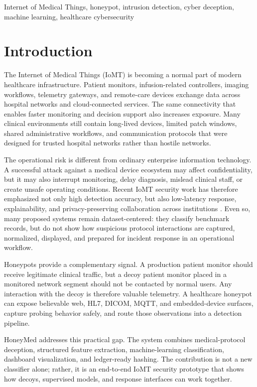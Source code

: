 \documentclass[conference, a4paper]{IEEEtran}
\begin{document}
\begin{IEEEkeywords}
Internet of Medical Things, honeypot, intrusion detection, cyber deception, machine learning, healthcare cybersecurity
\end{IEEEkeywords}

\section{Introduction}
The Internet of Medical Things (IoMT) is becoming a normal part of modern healthcare infrastructure. Patient monitors, infusion-related controllers, imaging workflows, telemetry gateways, and remote-care devices exchange data across hospital networks and cloud-connected services. The same connectivity that enables faster monitoring and decision support also increases exposure. Many clinical environments still contain long-lived devices, limited patch windows, shared administrative workflows, and communication protocols that were designed for trusted hospital networks rather than hostile networks.

The operational risk is different from ordinary enterprise information technology. A successful attack against a medical device ecosystem may affect confidentiality, but it may also interrupt monitoring, delay diagnosis, mislead clinical staff, or create unsafe operating conditions. Recent IoMT security work has therefore emphasized not only high detection accuracy, but also low-latency response, explainability, and privacy-preserving collaboration across institutions \cite{lipsa2025interpretable,hosain2025xaixgboost,tawfik2025fedmedsecure}. Even so, many proposed systems remain dataset-centered: they classify benchmark records, but do not show how suspicious protocol interactions are captured, normalized, displayed, and prepared for incident response in an operational workflow.

Honeypots provide a complementary signal. A production patient monitor should receive legitimate clinical traffic, but a decoy patient monitor placed in a monitored network segment should not be contacted by normal users. Any interaction with the decoy is therefore valuable telemetry. A healthcare honeypot can expose believable web, HL7, DICOM, MQTT, and embedded-device surfaces, capture probing behavior safely, and route those observations into a detection pipeline.

HoneyMed addresses this practical gap. The system combines medical-protocol deception, structured feature extraction, machine-learning classification, dashboard visualization, and ledger-ready hashing. The contribution is not a new classifier alone; rather, it is an end-to-end IoMT security prototype that shows how decoys, supervised models, and response interfaces can work together.
\end{document}
